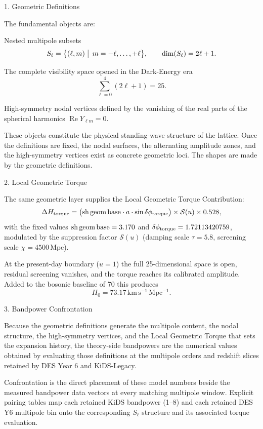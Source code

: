 1. Geometric Definitions

The fundamental objects are:

Nested multipole subsets  
  \[
  S_\ell=\bigl\{(\ell,m)\bigm|\,m=-\ell,\dots,+\ell\bigr\},\qquad\dim(S_\ell)=2\ell+1.
  \]

The complete visibility space opened in the Dark-Energy era  
  \[
  \sum_{\ell=0}^{4}(2\ell+1)=25.
  \]

High-symmetry nodal vertices defined by the vanishing of the real parts of the spherical harmonics \(\operatorname{Re}Y_{\ell m}=0\).

These objects constitute the physical standing-wave structure of the lattice. Once the definitions are fixed, the nodal surfaces, the alternating amplitude zones, and the high-symmetry vertices exist as concrete geometric loci. The shapes are made by the geometric definitions.

2. Local Geometric Torque

The same geometric layer supplies the Local Geometric Torque Contribution:
\[
\Delta H_{\rm torque}=\bigl({\rm sh\,geom\,base}\cdot a\cdot\sin\delta\phi_{\rm torque}\bigr)\times\mathcal{S}(u)\times0.528,
\]
with the fixed values \({\rm sh\,geom\,base}=3.170\) and \(\delta\phi_{\rm torque}=1.72113420759\), modulated by the suppression factor \(\mathcal{S}(u)\) (damping scale \(\tau=5.8\), screening scale \(\chi=4500\,\mathrm{Mpc}\)).

At the present-day boundary (\(u=1\)) the full 25-dimensional space is open, residual screening vanishes, and the torque reaches its calibrated amplitude. Added to the bosonic baseline of 70 this produces
\[
H_0=73.17\,\mathrm{km\,s^{-1}\,Mpc^{-1}}.
\]

3. Bandpower Confrontation

Because the geometric definitions generate the multipole content, the nodal structure, the high-symmetry vertices, and the Local Geometric Torque that sets the expansion history, the theory-side bandpowers are the numerical values obtained by evaluating those definitions at the multipole orders and redshift slices retained by DES Year 6 and KiDS-Legacy.

Confrontation is the direct placement of these model numbers beside the measured bandpower data vectors at every matching multipole window. Explicit pairing tables map each retained KiDS bandpower (1–8) and each retained DES Y6 multipole bin onto the corresponding \(S_\ell\) structure and its associated torque evaluation.

